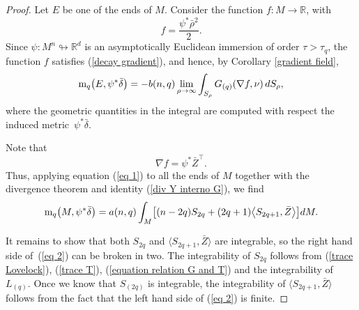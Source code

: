 \documentclass[10pt,a4paper]{article}
\numberwithin{equation}{section}
\begin{document}
\begin{proof}
 Let $E$ be one of the ends of $M$. Consider the function $f\colon M \to \mathbb{R}$, with
 \begin{equation*}
  f = \frac{\psi^\ast \bar{\rho}^2}{2}.
 \end{equation*}
 Since $\psi\colon  M^n \looparrowright \mathbb{R}^d$ is an asymptotically Euclidean immersion of order $\tau > \tau_q$, the function $f$ satisfies (\ref{decay gradient}), and hence, by Corollary \ref{gradient field},
 \begin{equation} \label{eq 1}
  \mathrm{m}_q \bigl(E,\psi^\ast \bar{\delta}\bigr) = -b(n,q) \lim_{\rho \to \infty} \int_{S_\rho} G_{(q)}(\nabla f,\nu)\, {\rm d}S_\rho,
 \end{equation}
 where the geometric quantities in the integral are computed with respect
 the induced metric~\(\psi^\ast \bar{\delta}\).

 Note that
 \begin{equation*}
  \nabla f = \psi^\ast \bar{Z}^\top.
 \end{equation*}
 Thus, applying equation (\ref{eq 1}) to all the ends of $M$ together
 with the divergence theorem and identity (\ref{div Y interno G}), we find
 \begin{equation} \label{eq 2}
  \mathrm{m}_q\bigl(M,\psi^\ast \bar{\delta}\bigr)
  = a(n,q) \int_M \bigl[ (n-2q)S_{2q} + (2q + 1) \bigl\langle S_{2q+1}, \bar{Z} \bigr\rangle \bigr] {\rm d}M.
 \end{equation}

 It remains to show that both $S_{2q}$ and $\bigl\langle S_{2q+1}, \bar{Z} \bigr\rangle$ are integrable, so the right hand side of~(\ref{eq 2}) can be broken in two. The integrability of $S_{2q}$ follows from (\ref{trace Lovelock}), (\ref{trace T}), (\ref{equation relation G and T}) and the integrability of $L_{(q)}$. Once we know that $S_{(2q)}$ is integrable, the integrability of $\bigl\langle S_{2q+1}, \bar{Z} \bigr\rangle$ follows from the fact that the left hand side of (\ref{eq 2}) is finite.
\end{proof}
\end{document}
